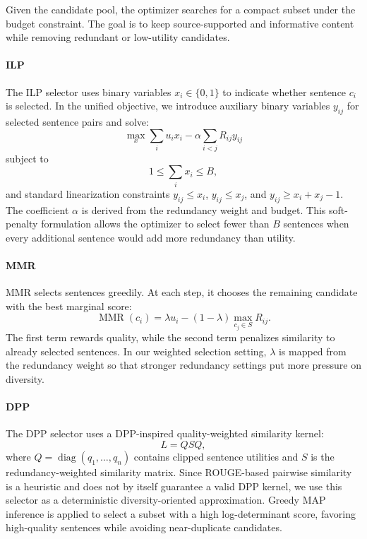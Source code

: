 \documentclass[11pt]{article}
\begin{document}
Given the candidate pool, the optimizer searches for a compact subset under the budget constraint. The goal is to keep source-supported and informative content while removing redundant or low-utility candidates.

\paragraph{ILP}
The ILP selector uses binary variables $x_i\in\{0,1\}$ to indicate whether sentence $c_i$ is selected. In the unified objective, we introduce auxiliary binary variables $y_{ij}$ for selected sentence pairs and solve:
\begin{equation}
\max_x
\sum_i u_i x_i
-
\alpha \sum_{i<j} R_{ij}y_{ij}
\end{equation}
subject to
\begin{equation}
1 \le \sum_i x_i \le B,
\end{equation}
and standard linearization constraints
$y_{ij}\le x_i$, $y_{ij}\le x_j$, and
$y_{ij}\ge x_i+x_j-1$.
The coefficient $\alpha$ is derived from the redundancy weight and budget. This soft-penalty formulation allows the optimizer to select fewer than $B$ sentences when every additional sentence would add more redundancy than utility.

\paragraph{MMR}
MMR selects sentences greedily. At each step, it chooses the remaining candidate with the best marginal score:
\begin{equation}
\operatorname{MMR}(c_i)=
\lambda u_i -
(1-\lambda)\max_{c_j\in S}R_{ij}.
\end{equation}
The first term rewards quality, while the second term penalizes similarity to already selected sentences. In our weighted selection setting, $\lambda$ is mapped from the redundancy weight so that stronger redundancy settings put more pressure on diversity.

\paragraph{DPP}
The DPP selector uses a DPP-inspired quality-weighted similarity kernel:
\begin{equation}
L = QSQ,
\end{equation}
where $Q=\operatorname{diag}(q_1,\ldots,q_n)$ contains clipped sentence utilities and $S$ is the redundancy-weighted similarity matrix. Since ROUGE-based pairwise similarity is a heuristic and does not by itself guarantee a valid DPP kernel, we use this selector as a deterministic diversity-oriented approximation. Greedy MAP inference is applied to select a subset with a high log-determinant score, favoring high-quality sentences while avoiding near-duplicate candidates.
\end{document}

